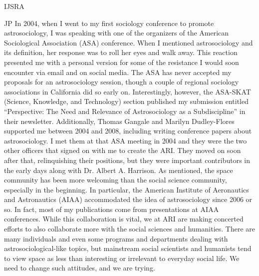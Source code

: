 \begin{labeling}{IJSRA}
	\item[JP] In 2004, when I went to my first sociology conference to promote astrosociology, I was speaking with one of the organizers of the American Sociological Association (ASA) conference. When I mentioned astrosociology and its definition, her response was to roll her eyes and walk away. This reaction presented me with a personal version for some of the resistance I would soon encounter via email and on social media. The ASA has never accepted my proposals for an astrosociology session, though a couple of regional sociology associations in California did so early on. Interestingly, however, the ASA-SKAT (Science, Knowledge, and Technology) section published my submission entitled “Perspective: The Need and Relevance of Astrosociology as a Subdiscipline” in their newsletter. Additionally, Thomas Gangale and Marilyn Dudley-Flores supported me between 2004 and 2008, including writing conference papers about astrosociology. I met them at that ASA meeting in 2004 and they were the two other officers that signed on with me to create the ARI. They moved on soon after that, relinquishing their positions, but they were important contributors in the early days along with Dr. Albert A. Harrison. As mentioned, the space community has been more welcoming than the social science community, especially in the beginning. In particular, the American Institute of Aeronautics and Astronautics (AIAA) accommodated the idea of astrosociology since 2006 or so. In fact, most of my publications come from presentations at AIAA conferences. While this collaboration is vital, we at ARI are making concerted efforts to also collaborate more with the social sciences and humanities. There are many individuals and even some programs and departments dealing with astrosociological-like topics, but mainstream social scientists and humanists tend to view space as less than interesting or irrelevant to everyday social life. We need to change such attitudes, and we are trying.


\end{labeling}
